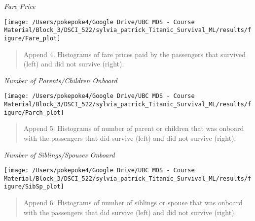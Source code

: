 \documentclass[]{article}
\begin{document}
\newpage

\emph{Fare Price}

\begin{center}\texttt{[image: /Users/pokepoke4/Google Drive/UBC MDS - Course Material/Block\_3/DSCI\_522/sylvia\_patrick\_Titanic\_Survival\_ML/results/figure/Fare\_plot]} \end{center}

\begin{quote}
Append 4. Histograms of fare prices paid by the passengers that survived
(left) and did not survive (right).
\end{quote}

\newpage

\emph{Number of Parents/Children Onboard}

\begin{center}\texttt{[image: /Users/pokepoke4/Google Drive/UBC MDS - Course Material/Block\_3/DSCI\_522/sylvia\_patrick\_Titanic\_Survival\_ML/results/figure/Parch\_plot]} \end{center}

\begin{quote}
Append 5. Histograms of number of parent or children that was onboard
with the passengers that did survive (left) and did not survive (right).
\end{quote}

\newpage

\emph{Number of Siblings/Spouses Onboard}

\begin{center}\texttt{[image: /Users/pokepoke4/Google Drive/UBC MDS - Course Material/Block\_3/DSCI\_522/sylvia\_patrick\_Titanic\_Survival\_ML/results/figure/SibSp\_plot]} \end{center}

\begin{quote}
Append 6. Histograms of number of siblings or spouse that was onboard
with the passengers that did survive (left) and did not survive (right).
\end{quote}
\end{document}
